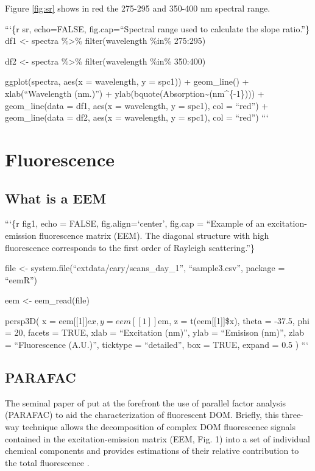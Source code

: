 \documentclass[]{book}
\theoremstyle{definition}
\theoremstyle{definition}
\theoremstyle{remark}
\begin{document}
Figure \ref{fig:sr} shows in red the 275-295 and 350-400 nm spectral
range.

```\{r sr, echo=FALSE, fig.cap=``Spectral range used to calculate the
slope ratio.''\} df1 \textless{}- spectra \%\textgreater{}\%
filter(wavelength \%in\% 275:295)

df2 \textless{}- spectra \%\textgreater{}\% filter(wavelength \%in\%
350:400)

ggplot(spectra, aes(x = wavelength, y = spc1)) + geom\_line() +
xlab(``Wavelength (nm.)'') +
ylab(bquote(Absorption\textasciitilde{}(nm\^{}\{-1\}))) +
geom\_line(data = df1, aes(x = wavelength, y = spc1), col = ``red'') +
geom\_line(data = df2, aes(x = wavelength, y = spc1), col = ``red'') ```

\chapter{Fluorescence}\label{fluorescence}

\section{What is a EEM}\label{what-is-a-eem}

```\{r fig1, echo = FALSE, fig.align=`center', fig.cap = ``Example of an
excitation-emission fluorescence matrix (EEM). The diagonal structure
with high fluorescence corresponds to the first order of Rayleigh
scattering.''\}

file \textless{}- system.file(``extdata/cary/scans\_day\_1'',
``sample3.csv'', package = ``eemR'')

eem \textless{}- eem\_read(file)

persp3D( x = eem{[}{[}1{]}{]}\(ex,  y = eem[[1]]\)em, z =
t(eem{[}{[}1{]}{]}\$x), theta = -37.5, phi = 20, facets = TRUE, xlab =
``Excitation (nm)'', ylab = ``Emisison (nm)'', zlab = ``Fluorescence
(A.U.)'', ticktype = ``detailed'', box = TRUE, expand = 0.5 ) ```

\section{PARAFAC}\label{parafac}

The seminal paper of \citep{Stedmon2003a} put at the forefront the use
of parallel factor analysis (PARAFAC) to aid the characterization of
fluorescent DOM. Briefly, this three-way technique allows the
decomposition of complex DOM fluorescence signals contained in the
excitation-emission matrix (EEM, Fig. 1) into a set of individual
chemical components and provides estimations of their relative
contribution to the total fluorescence
\citep{Bro1997, Fellman2010, Stedmon2003a}.
\end{document}

